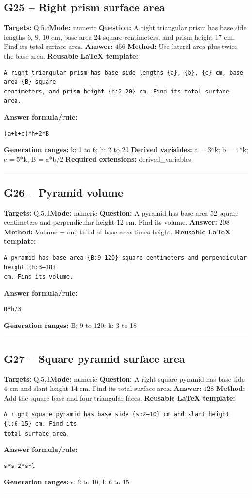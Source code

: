 \documentclass[11pt]{article}
\begin{document}
\subsection{G25 -- Right prism surface area}
\textbf{Targets:} Q.5.c\quad\textbf{Mode:} numeric
\textbf{Question:} A right triangular prism has base side lengths 6, 8, 10 cm, base area 24 square centimeters, and prism height 17 cm. Find its total surface area.
\textbf{Answer:} \(456\)
\textbf{Method:} Use lateral area plus twice the base area.
\textbf{Reusable LaTeX template:}
\begin{verbatim}
A right triangular prism has base side lengths {a}, {b}, {c} cm, base area {B} square
centimeters, and prism height {h:2–20} cm. Find its total surface area.
\end{verbatim}
\textbf{Answer formula/rule:}
\begin{verbatim}
(a+b+c)*h+2*B
\end{verbatim}
\textbf{Generation ranges:} k: 1 to 6; h: 2 to 20
\textbf{Derived variables:} a = 3*k; b = 4*k; c = 5*k; B = a*b/2
\textbf{Required extensions:} derived\_variables
\medskip\hrule\medskip
\subsection{G26 -- Pyramid volume}
\textbf{Targets:} Q.5.d\quad\textbf{Mode:} numeric
\textbf{Question:} A pyramid has base area 52 square centimeters and perpendicular height 12 cm. Find its volume.
\textbf{Answer:} \(208\)
\textbf{Method:} Volume = one third of base area times height.
\textbf{Reusable LaTeX template:}
\begin{verbatim}
A pyramid has base area {B:9–120} square centimeters and perpendicular height {h:3–18}
cm. Find its volume.
\end{verbatim}
\textbf{Answer formula/rule:}
\begin{verbatim}
B*h/3
\end{verbatim}
\textbf{Generation ranges:} B: 9 to 120; h: 3 to 18
\medskip\hrule\medskip
\subsection{G27 -- Square pyramid surface area}
\textbf{Targets:} Q.5.d\quad\textbf{Mode:} numeric
\textbf{Question:} A right square pyramid has base side 4 cm and slant height 14 cm. Find its total surface area.
\textbf{Answer:} \(128\)
\textbf{Method:} Add the square base and four triangular faces.
\textbf{Reusable LaTeX template:}
\begin{verbatim}
A right square pyramid has base side {s:2–10} cm and slant height {l:6–15} cm. Find its
total surface area.
\end{verbatim}
\textbf{Answer formula/rule:}
\begin{verbatim}
s*s+2*s*l
\end{verbatim}
\textbf{Generation ranges:} s: 2 to 10; l: 6 to 15
\medskip\hrule\medskip
\end{document}

